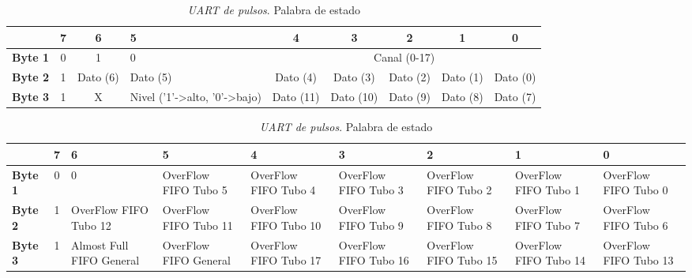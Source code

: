             \begin{table}[h]
                \tiny
                \begin{tabularx}{\textwidth}{|l|c|c|X|c|c|c|c|c|}
                    \hline
                    \rowcolor[HTML]{C0C0C0} 
                    \multicolumn{1}{|r|}{\textbf{Bit}}    	& 7 & 6          & 5 				& 4 	       & 3 	     & 2 	  & 1          & 0 	     \\ \hline
                    \cellcolor[HTML]{C0C0C0}\textbf{Byte 1} & 0 & 1          & 0  				& \multicolumn{5}{c|}{Canal (0-17)}				     \\ \hline
                    \cellcolor[HTML]{C0C0C0}\textbf{Byte 2} & 1 & Dato (6)	 & Dato (5)      		& Dato (4)     & Dato (3)    & Dato (2)   & Dato (1)   & Dato (0)    \\ \hline
                    \cellcolor[HTML]{C0C0C0}\textbf{Byte 3} & 1 & X          & Nivel ('1'->alto, '0'->bajo) & Dato (11)    & Dato (10)   & Dato (9)   & Dato (8)   & Dato (7)    \\ \hline
                \end{tabularx}
                \caption{\emph{UART de pulsos}. Palabra de ancho de pulso}
                \label{tab:FPGAUartPulso}
                \begin{tabularx}{\textwidth}{|l|c|X|X|X|X|X|X|X|}
                    \hline
                    \rowcolor[HTML]{C0C0C0} 
                    \multicolumn{1}{|r|}{\textbf{Bit}} 	& 7 & 6 		       & 5 		       & 4		       & 3 		       & 2		       & 1          	       & 0			\\ \hline
                    \cellcolor[HTML]{C0C0C0}\textbf{Byte 1} & 0 & 0                        & OverFlow FIFO Tubo 5  & OverFlow FIFO Tubo 4  & OverFlow FIFO Tubo 3  & OverFlow FIFO Tubo 2  & OverFlow FIFO Tubo 1  & OverFlow FIFO Tubo 0	\\ \hline
                    \cellcolor[HTML]{C0C0C0}\textbf{Byte 2} & 1 & OverFlow FIFO Tubo 12    & OverFlow FIFO Tubo 11 & OverFlow FIFO Tubo 10 & OverFlow FIFO Tubo 9  & OverFlow FIFO Tubo 8  & OverFlow FIFO Tubo 7  & OverFlow FIFO Tubo 6	\\ \hline
                    \cellcolor[HTML]{C0C0C0}\textbf{Byte 3} & 1 & Almost Full FIFO General & OverFlow FIFO General & OverFlow FIFO Tubo 17 & OverFlow FIFO Tubo 16 & OverFlow FIFO Tubo 15 & OverFlow FIFO Tubo 14 & OverFlow FIFO Tubo 13	\\ \hline
                \end{tabularx}
                \caption{\emph{UART de pulsos}. Palabra de estado}

\end{table}
